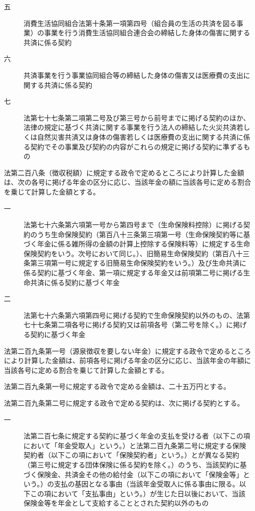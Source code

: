 \documentclass[twocolumn,a4j,10pt]{ltjtarticle}
\begin{document}
\begin{description}
\begin{description}
\item[五]消費生活協同組合法第十条第一項第四号（組合員の生活の共済を図る事業）の事業を行う消費生活協同組合連合会の締結した身体の傷害に関する共済に係る契約
\item[六]共済事業を行う事業協同組合等の締結した身体の傷害又は医療費の支出に関する共済に係る契約
\item[七]法第七十七条第二項第二号及び第三号から前号までに掲げる契約のほか、法律の規定に基づく共済に関する事業を行う法人の締結した火災共済若しくは自然災害共済又は身体の傷害若しくは医療費の支出に関する共済に係る契約でその事業及び契約の内容がこれらの規定に掲げる契約に準ずるもの
\end{description}
\item[\rensuji{3}]法第二百八条（徴収税額）に規定する政令で定めるところにより計算した金額は、次の各号に掲げる年金の区分に応じ、当該年金の額に当該各号に定める割合を乗じて計算した金額とする。
\begin{description}
\item[一]法第七十六条第六項第一号から第四号まで（生命保険料控除）に掲げる契約のうち生命保険契約（第百八十三条第三項第一号（生命保険契約等に基づく年金に係る雑所得の金額の計算上控除する保険料等）に規定する生命保険契約をいう。次号において同じ。）、旧簡易生命保険契約（第百八十三条第三項第一号に規定する旧簡易生命保険契約をいう。）及び生命共済に係る契約に基づく年金、第一項に規定する年金又は前項第二号に掲げる生命共済に係る契約に基づく年金
\item[二]法第七十六条第六項第四号に掲げる契約で生命保険契約以外のもの、法第七十七条第二項各号に掲げる契約又は前項各号（第二号を除く。）に掲げる契約に基づく年金
\end{description}
\item[\rensuji{4}]法第二百九条第一号（源泉徴収を要しない年金）に規定する政令で定めるところにより計算した金額は、前項各号に掲げる年金の区分に応じ、当該年金の年額に当該各号に定める割合を乗じて計算した金額とする。
\item[\rensuji{5}]法第二百九条第一号に規定する政令で定める金額は、二十五万円とする。
\item[\rensuji{6}]法第二百九条第二号に規定する政令で定める契約は、次に掲げる契約とする。
\begin{description}
\item[一]法第二百七条に規定する契約に基づく年金の支払を受ける者（以下この項において「年金受取人」という。）と法第二百九条第二号に規定する保険契約者（以下この項において「保険契約者」という。）とが異なる契約（第三号に規定する団体保険に係る契約を除く。）のうち、当該契約に基づく保険金、共済金その他の給付金（以下この項において「保険金等」という。）の支払の基因となる事由（当該年金受取人に係る事由に限る。以下この項において「支払事由」という。）が生じた日以後において、当該保険金等を年金として支給することとされた契約以外のもの

\end{description}
\end{description}
\end{document}
